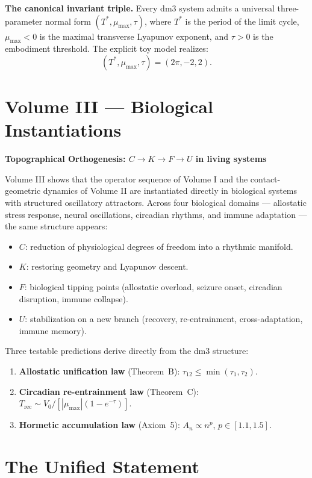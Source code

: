 \documentclass[12pt, oneside]{book}
\theoremstyle{plain}
\theoremstyle{definition}
\theoremstyle{remark}
\begin{document}
\noindent\textbf{The canonical invariant triple.}
Every dm3 system admits a universal three-parameter normal form
$(T^*, \mu_{\max}, \tau)$, where $T^*$ is the period of the limit cycle,
$\mu_{\max} < 0$ is the maximal transverse Lyapunov exponent, and $\tau > 0$
is the embodiment threshold. The explicit toy model realizes:
\[
(T^*, \mu_{\max}, \tau) = (2\pi, -2, 2).
\]

\section*{Volume III --- Biological Instantiations}

\textbf{Topographical Orthogenesis: $C \to K \to F \to U$ in living systems}

\medskip\noindent
Volume III shows that the operator sequence of Volume I and the contact-geometric
dynamics of Volume II are instantiated directly in biological systems with
structured oscillatory attractors. Across four biological domains --- allostatic
stress response, neural oscillations, circadian rhythms, and immune adaptation ---
the same structure appears:
\begin{itemize}
\item $C$: reduction of physiological degrees of freedom into a rhythmic manifold.
\item $K$: restoring geometry and Lyapunov descent.
\item $F$: biological tipping points (allostatic overload, seizure onset,
      circadian disruption, immune collapse).
\item $U$: stabilization on a new branch (recovery, re-entrainment,
      cross-adaptation, immune memory).
\end{itemize}
Three testable predictions derive directly from the dm3 structure:
\begin{enumerate}
\item \textbf{Allostatic unification law} (Theorem~B):
      $\tau_{12} \le \min(\tau_1, \tau_2)$.
\item \textbf{Circadian re-entrainment law} (Theorem~C):
      $T_{\mathrm{rec}} \sim V_0/[|\mu_{\max}|(1-e^{-\tau})]$.
\item \textbf{Hormetic accumulation law} (Axiom~5):
      $A_n \propto n^p$, $p \in [1.1, 1.5]$.
\end{enumerate}

\section*{The Unified Statement}
\end{document}
